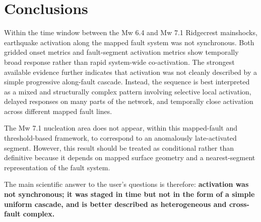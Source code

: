 \documentclass[11pt]{article}
\begin{document}
\section{Conclusions}
Within the time window between the Mw 6.4 and Mw 7.1 Ridgecrest mainshocks, earthquake activation along the mapped fault system was not synchronous. Both gridded onset metrics and fault-segment activation metrics show temporally broad response rather than rapid system-wide co-activation. The strongest available evidence further indicates that activation was not cleanly described by a simple progressive along-fault cascade. Instead, the sequence is best interpreted as a mixed and structurally complex pattern involving selective local activation, delayed responses on many parts of the network, and temporally close activation across different mapped fault lines.

The Mw 7.1 nucleation area does not appear, within this mapped-fault and threshold-based framework, to correspond to an anomalously late-activated segment. However, this result should be treated as conditional rather than definitive because it depends on mapped surface geometry and a nearest-segment representation of the fault system.

The main scientific answer to the user’s questions is therefore: \textbf{activation was not synchronous; it was staged in time but not in the form of a simple uniform cascade, and is better described as heterogeneous and cross-fault complex.}
\end{document}
